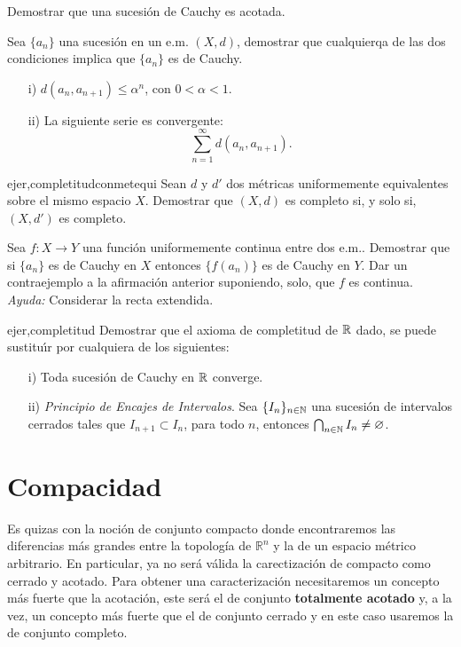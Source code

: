 \begin{ejercicio}{} Demostrar que una sucesión de Cauchy es
acotada.
\end{ejercicio}

\begin{ejercicio}{} Sea $\{a_n\}$ una sucesión en un e.m. $(X,d)$,
demostrar que cualquierqa de las dos condiciones implica que
$\{a_n\}$ es de Cauchy.
\begin{itemize}
    \item[i)] $d(a_n,a_{n+1})\leq \alpha^n$, con $0<\alpha<1$.
    \item[ii)] La siguiente serie es convergente:
    \[
        \sum\limits_{n=1}^{\infty}d(a_n,a_{n+1}).
    \]
\end{itemize}
\end{ejercicio}

\begin{ejercicio}{ejer,completitudconmetequi} Sean $d$ y $d'$ dos métricas
 uniformemente equivalentes
sobre el mismo espacio $X$. Demostrar que $(X,d)$ es completo si,
y solo si, $(X,d')$ es completo.
\end{ejercicio}

\begin{ejercicio}{} Sea $f:X\to Y$ una función uniformemente
continua entre dos e.m.. Demostrar que si $\{a_n\}$ es de Cauchy
en $X$ entonces $\{f(a_n)\}$ es de Cauchy en $Y$. Dar un
contraejemplo a la afirmación anterior suponiendo, solo, que $f$
es continua. \emph{Ayuda:} Considerar la recta extendida.
\end{ejercicio}


\begin{ejercicio}{ejer,completitud} Demostrar que el axioma de completitud de $\mathbb{R}$
dado, se puede sustitu\'{\i}r por cualquiera de los siguientes:
\begin{itemize}
    \item[i)] Toda sucesión de Cauchy en $\mathbb{R}$ converge.
    \item[ii)] \emph{Principio de Encajes de Intervalos}. Sea
    $\{I_n\}_{n\in\mathbb{N}}$ una sucesión de intervalos cerrados
    tales que $I_{n+1}\subset I_n$, para todo $n$, entonces
    $\bigcap_{n\in\mathbb{N}}I_n\neq\varnothing$.
\end{itemize}
\end{ejercicio}
% 
% 
\section{Compacidad}

Es quizas con la noción de conjunto compacto donde encontraremos
las diferencias más grandes entre la topología de $\mathbb{R}^n$
y la de un espacio métrico arbitrario. En particular, ya no será
válida la carectización de compacto como cerrado y acotado. Para
obtener una caracterización necesitaremos un concepto más fuerte
que la acotación, este será el de conjunto \textbf{totalmente
acotado} y, a la vez, un concepto más fuerte que el de conjunto
cerrado y en este caso usaremos la de conjunto completo.

